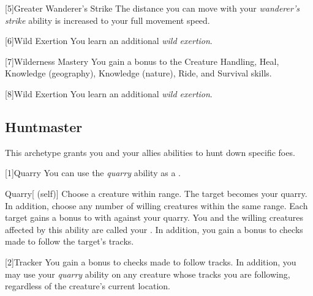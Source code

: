         [5]{Greater Wanderer's Strike} The distance you can move with your \textit{wanderer's strike} ability is increased to your full movement speed.

        [6]{Wild Exertion} 
        You learn an additional \textit{wild exertion}.

        [7]{Wilderness Mastery} You gain a  bonus to the Creature Handling, Heal, Knowledge (geography), Knowledge (nature), Ride, and Survival skills.

        [8]{Wild Exertion} 
        You learn an additional \textit{wild exertion}.

    \subsection{Huntmaster}
        This archetype grants you and your allies abilities to hunt down specific foes.

        [1]{Quarry}\label{Quarry} You can use the \textit{quarry} ability as a .
        \begin{attuneability}{Quarry}[ (self)]
            Choose a creature within \rnglong range.
            The target becomes your quarry.
            In addition, choose any number of willing creatures within the same range.
            Each target gains a  bonus to  with  against your quarry.
            You and the willing creatures affected by this ability are called your .
            In addition, you gain a  bonus to checks made to follow the target's tracks.
        \end{attuneability}

        [2]{Tracker}
        You gain a  bonus to checks made to follow tracks.
        In addition, you may use your \textit{quarry} ability on any creature whose tracks you are following, regardless of the creature's current location.

